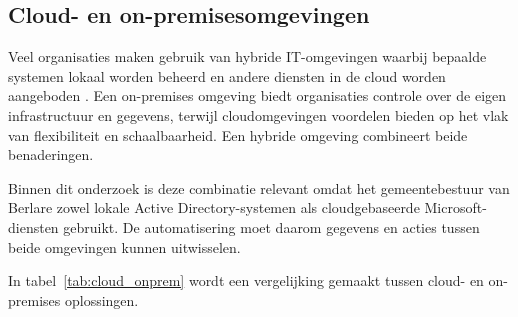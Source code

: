 \subsection{Cloud- en on-premisesomgevingen}

Veel organisaties maken gebruik van hybride IT-omgevingen waarbij bepaalde systemen lokaal worden beheerd en andere diensten in de cloud worden aangeboden \autocite{Wong2023}. Een on-premises omgeving biedt organisaties controle over de eigen infrastructuur en gegevens, terwijl cloudomgevingen voordelen bieden op het vlak van flexibiliteit en schaalbaarheid. Een hybride omgeving combineert beide benaderingen.

Binnen dit onderzoek is deze combinatie relevant omdat het gemeentebestuur van Berlare zowel lokale Active Directory-systemen als cloudgebaseerde Microsoft-diensten gebruikt. De automatisering moet daarom gegevens en acties tussen beide omgevingen kunnen uitwisselen.

In tabel~\ref{tab:cloud_onprem} wordt een vergelijking gemaakt tussen cloud- en on-premises oplossingen.

